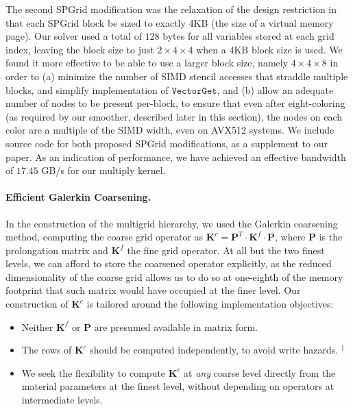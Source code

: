 The second SPGrid modification was the relaxation of the design restriction in \cite{setaluri2014spgrid} that each SPGrid block be sized to exactly 4KB (the size of a virtual memory page). Our solver used a total of $128$ bytes for all variables stored at each grid index, leaving the block size to just $2\times 4\times 4$ when a 4KB block size is used. We found it more effective to be able to use a larger block size, namely $4\times 4\times 8$ in order to (a) minimize the number of SIMD stencil accesses that straddle multiple blocks, and simplify implementation of $\texttt{VectorGet}$, and (b) allow an adequate number of nodes to be present per-block, to ensure that even after eight-coloring (as required by our smoother, described later in this section), the nodes on each color are a multiple of the SIMD width, even on AVX512 systems. We include source code for both proposed SPGrid modifications, as a supplement to our paper. As an indication of performance, we have achieved an effective bandwidth of $17.45$ GB/s for our multiply kernel.


\paragraph{Efficient Galerkin Coarsening.} In the construction of the multigrid hierarchy, we used the Galerkin coarsening method, computing the coarse grid operator as 
$\mathbf{K}^{c} = \mathbf{P}^T \cdot \mathbf{K}^{f} \cdot \mathbf{P}$, where $\mathbf{P}$ is the prolongation matrix and $\mathbf{K}^{f}$ the fine grid operator. At all but the two finest
levels, we can afford to store the coarsened operator explicitly, as the reduced dimensionality of the coarse grid allows us to do so at one-eighth of the memory footprint that such
matrix would have occupied at the finer level. Our construction of $\mathbf{K}^{c}$ is tailored around the following implementation objectives:
\begin{itemize}
\item Neither $\mathbf{K}^{f}$ or $\mathbf{P}$ are presumed available in matrix form.
\item The rows of $\mathbf{K}^{c}$ should be computed independently, to avoid write hazards.
$^\dagger$\item We seek the flexibility to compute $\mathbf{K}^{c}$ at \emph{any} coarse level directly from the material parameters at the finest level, without depending on operators
  at intermediate levels.
\end{itemize}

